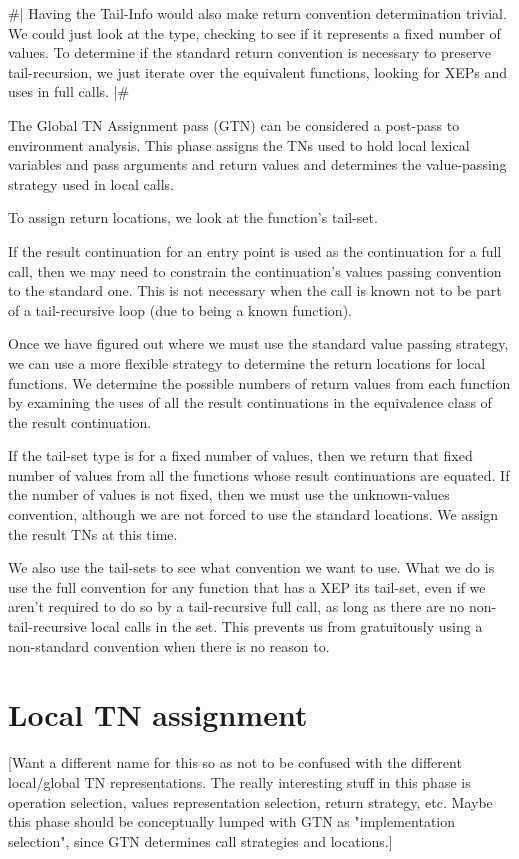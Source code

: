 \#|
Having the Tail-Info would also make return convention determination trivial.
We could just look at the type, checking to see if it represents a fixed number
of values.  To determine if the standard return convention is necessary to
preserve tail-recursion, we just iterate over the equivalent functions, looking
for XEPs and uses in full calls.
|\#

The Global TN Assignment pass (GTN) can be considered a post-pass to
environment analysis.  This phase assigns the TNs used to hold local lexical
variables and pass arguments and return values and determines the value-passing
strategy used in local calls.

To assign return locations, we look at the function's tail-set.

If the result continuation for an entry point is used as the continuation for a
full call, then we may need to constrain the continuation's values passing
convention to the standard one.  This is not necessary when the call is known
not to be part of a tail-recursive loop (due to being a known function).

Once we have figured out where we must use the standard value passing strategy,
we can use a more flexible strategy to determine the return locations for local
functions.  We determine the possible numbers of return values from each
function by examining the uses of all the result continuations in the
equivalence class of the result continuation.

If the tail-set type is for a fixed number of
values, then we return that fixed number of values from all the functions whose
result continuations are equated.  If the number of values is not fixed, then
we must use the unknown-values convention, although we are not forced to use
the standard locations.  We assign the result TNs at this time.

We also use the tail-sets to see what convention we want to use.  What we do is
use the full convention for any function that has a XEP its tail-set, even if
we aren't required to do so by a tail-recursive full call, as long as there are
no non-tail-recursive local calls in the set.  This prevents us from
gratuitously using a non-standard convention when there is no reason to.


\chapter{Local TN assignment}

[Want a different name for this so as not to be confused with the different
local/global TN representations.  The really interesting stuff in this phase is
operation selection, values representation selection, return strategy, etc.
Maybe this phase should be conceptually lumped with GTN as "implementation
selection", since GTN determines call strategies and locations.]

